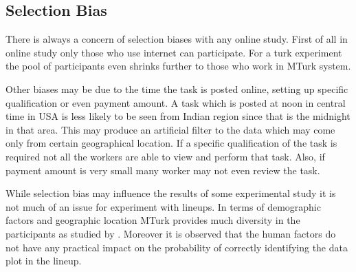 \documentclass[11pt]{article}
\begin{document}


\subsection{Selection Bias} 


There is always a concern of selection biases with any online study. First of all in online study only those who use internet can participate. For a turk experiment the pool of participants even shrinks further to those who work in MTurk system. 

Other biases may be due to the time the task is posted online, setting up specific qualification or even payment amount. A task which is posted at noon in central time in USA is less likely to be seen from Indian region since that is the midnight in that area. This may produce an artificial filter to the data which may come only from certain geographical location. If a specific qualification of the task is required not all the workers are able to view and perform that task. Also, if payment amount is very small many worker may not even review the task.  

While selection bias may influence the results of some experimental study it is not much of an issue for experiment with lineups. In terms of demographic factors and geographic location MTurk provides much diversity in the participants as studied by \cite{majumder:socio}. Moreover it is observed that the human factors do not have any practical impact on the probability of correctly identifying the data plot in the lineup. 
\end{document}
